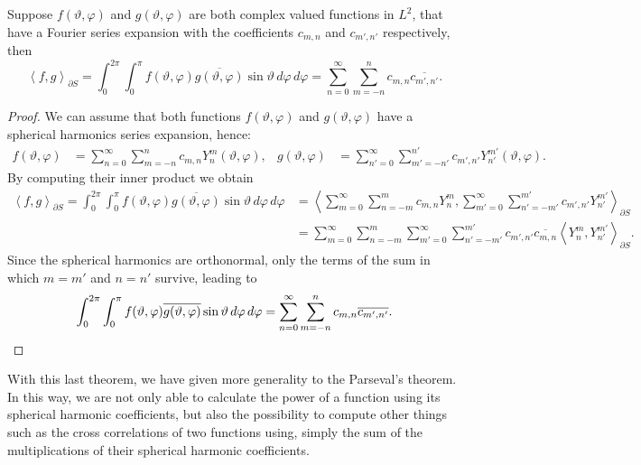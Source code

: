 \begin{theorem} %
  \label{kugel:thm:general-parseval-sph}
  Suppose $f(\vartheta, \varphi)$ and $g(\vartheta, \varphi)$ are both complex
  valued functions in $L^2$, that have a Fourier series expansion with the
  coefficients $c_{m,n}$ and $c_{m',n'}$ respectively, then
  \begin{equation}
    \label{kugel:eqn:general-parseval-sph}
    \left\langle f, g\right\rangle_{\partial S}
    = \int_0^{2\pi}\int_0^\pi
      f(\vartheta, \varphi) \overline{g(\vartheta, \varphi)}
      \sin\vartheta \, d\varphi \, d\varphi 
    = \sum_{n=0}^\infty\sum_{m=-n}^n c_{m,n}\overline{c_{m',n'}}.
  \end{equation}
\end{theorem}
\begin{proof}
  We can assume that both functions $f(\vartheta, \varphi)$ and $g(\vartheta,
  \varphi)$ have a spherical harmonics series expansion, hence:
  \begin{align*}
    f(\vartheta, \varphi) &= \sum_{n=0 }^\infty \sum_{m =-n }^{n }
      c_{m, n } Y^{m }_{n }(\vartheta, \varphi), &
    g(\vartheta, \varphi) &= \sum_{n'=0}^\infty \sum_{m'=-n'}^{n'}
      c_{m',n'} Y^{m'}_{n'}(\vartheta, \varphi).
  \end{align*}
  By computing their inner product we obtain
  \begin{align*}
    \left\langle f, g\right\rangle_{\partial S}
    = \int_0^{2\pi}\int_0^\pi
      f(\vartheta, \varphi)\overline{g(\vartheta, \varphi)}
      \sin\vartheta \, d\varphi \, d\varphi 
    &= \left\langle
        \sum^\infty_{m=0}\sum_{n=-m}^m c_{m,n} Y^m_n,
        \sum^\infty_{m'=0}\sum_{n'=-m'}^{m'} c_{m',n'} Y^{m'}_{n'}
      \right\rangle_{\partial S} \\
    &= \sum_{m=0}^\infty \sum_{n=-m}^m \sum_{m'=0}^\infty \sum_{n'=-m'}^{m'} c_{m',n'}\overline{c_{m,n}} \left\langle Y^m_n,  Y^{m'}_{n'} \right\rangle_{\partial S}.
  \end{align*}
  Since the spherical harmonics are orthonormal, only the terms of the sum in
  which $m=m'$ and $n=n'$ survive, leading to
  \begin{equation*}
    \int_0^{2\pi}\int_0^\pi
      f(\vartheta, \varphi)\overline{g(\vartheta, \varphi)}
      \sin\vartheta \, d\varphi \, d\varphi 
    = \sum_{n=0}^\infty\sum_{m=-n}^n
      c_{m,n}\overline{c_{m',n'}}. \qedhere
  \end{equation*}
\end{proof}

With this last theorem, we have given more generality to the Parseval's theorem.
In this way, we are not only able to calculate the power of a function using its
spherical harmonic coefficients, but also the possibility to compute other
things such as the cross correlations of two functions using, simply the sum of
the multiplications of their spherical harmonic coefficients.
